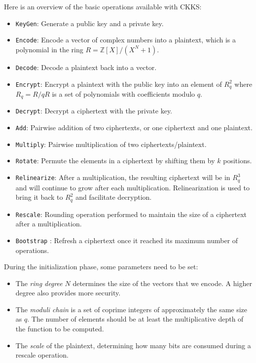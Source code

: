 \documentclass[a4paper,11pt,oneside]{report}
\begin{document}
Here is an overview of the basic operations available with CKKS:
\begin{itemize}
    \item \texttt{KeyGen}: Generate a public key and a private key.
    \item \texttt{Encode}: Encode a vector of complex numbers into a plaintext, which is a polynomial in the ring $R = \mathbb{Z}[X]/(X^N + 1)$.
    \item \texttt{Decode}: Decode a plaintext back into a vector.
    \item \texttt{Encrypt}: Encrypt a plaintext with the public key into an element of $R_q^2$ where $R_q = R/qR$ is a set of polynomials with coefficients modulo $q$.
    \item \texttt{Decrypt}: Decrypt a ciphertext with the private key.
    \item \texttt{Add}: Pairwise addition of two ciphertexts, or one ciphertext and one plaintext.
    \item \texttt{Multiply}: Pairwise multiplication of two ciphertexts/plaintext.
    \item \texttt{Rotate}: Permute the elements in a ciphertext by shifting them by $k$ positions.
    \item \texttt{Relinearize}: After a multiplication, the resulting ciphertext will be in $R_q^3$ and will continue to grow after each multiplication. 
    Relinearization is used to bring it back to $R_q^2$ and facilitate decryption.
    \item \texttt{Rescale}: Rounding operation performed to maintain the size of a ciphertext after a multiplication.
    \item \texttt{Bootstrap} \cite{nielsen_bootstrapping_2018}: Refresh a ciphertext once it reached its maximum number of operations.
\end{itemize}

During the initialization phase, some parameters need to be set:

\begin{itemize}
  \item The \emph{ring degree} $N$ determines the size of the vectors that we encode. A higher degree also provides more security.
  \item The \emph{moduli chain} is a set of coprime integers of approximately the same size as $q$. 
  The number of elements should be at least the multiplicative depth of the function to be computed.
  \item The \emph{scale} of the plaintext, determining how many bits are consumed during a rescale operation.
\end{itemize}
\end{document}
